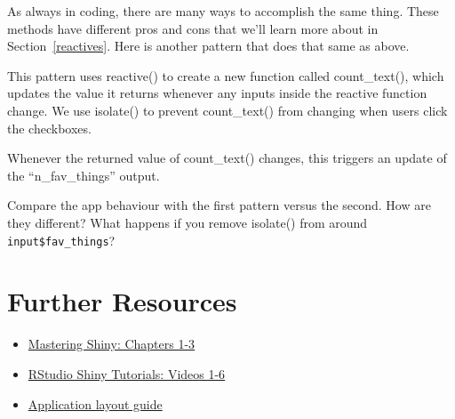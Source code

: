\documentclass[
]{book}
\newenvironment{Shaded}{\begin{snugshade}}{\end{snugshade}}
\newcommand{\CommentTok}[1]{\textcolor[rgb]{0.56,0.35,0.01}{\textit{#1}}}
\newcommand{\ControlFlowTok}[1]{\textcolor[rgb]{0.13,0.29,0.53}{\textbf{#1}}}
\newcommand{\FunctionTok}[1]{\textcolor[rgb]{0.00,0.00,0.00}{#1}}
\newcommand{\NormalTok}[1]{#1}
\newcommand{\OtherTok}[1]{\textcolor[rgb]{0.56,0.35,0.01}{#1}}
\newcommand{\SpecialCharTok}[1]{\textcolor[rgb]{0.00,0.00,0.00}{#1}}
\newcommand{\StringTok}[1]{\textcolor[rgb]{0.31,0.60,0.02}{#1}}
\providecommand{\tightlist}{%
  \setlength{\itemsep}{0pt}\setlength{\parskip}{0pt}}
\begin{document}
As always in coding, there are many ways to accomplish the same thing. These methods have different pros and cons that we'll learn more about in Section~\ref{reactives}. Here is another pattern that does that same as above.

This pattern uses reactive() to create a new function called count\_text(), which updates the value it returns whenever any inputs inside the reactive function change. We use isolate() to prevent count\_text() from changing when users click the checkboxes.

Whenever the returned value of count\_text() changes, this triggers an update of the ``n\_fav\_things'' output.

\begin{Shaded}
\end{Shaded}

Compare the app behaviour with the first pattern versus the second. How are they different? What happens if you remove isolate() from around \texttt{input\$fav\_things}?

\hypertarget{resources-first-app}{%
\section{Further Resources}\label{resources-first-app}}

\begin{itemize}
\tightlist
\item
  \href{https://mastering-shiny.org/}{Mastering Shiny: Chapters 1-3}
\item
  \href{https://shiny.rstudio.com/tutorial/}{RStudio Shiny Tutorials: Videos 1-6}
\item
  \href{https://shiny.rstudio.com/articles/layout-guide.html}{Application layout guide}
\end{itemize}
\end{document}

